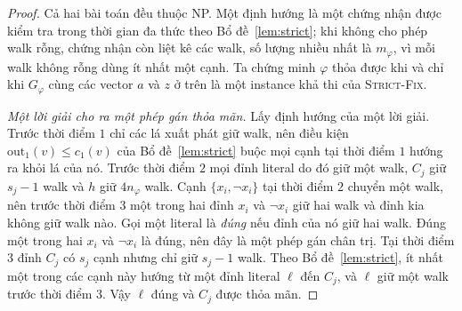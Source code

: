 \documentclass[pdflatex,sn-mathphys-num]{sn-jnl}
\theoremstyle{thmstyleone}%
\theoremstyle{thmstyletwo}%
\theoremstyle{thmstylethree}%
\newcommand{\out}{\mathrm{out}}
\newcommand{\SFIX}{\textup{\textsc{Strict-Fix}}}
\begin{document}
\begin{proof}
Cả hai bài toán đều thuộc NP. Một định hướng là một chứng nhận được kiểm tra trong thời gian đa thức theo Bổ đề~\ref{lem:strict}; khi không cho phép walk rỗng, chứng nhận còn liệt kê các walk, số lượng nhiều nhất là $m_\varphi$, vì mỗi walk không rỗng dùng ít nhất một cạnh. Ta chứng minh $\varphi$ thỏa được khi và chỉ khi $G_\varphi$ cùng các vector $a$ và $z$ ở trên là một instance khả thi của \SFIX{}.

\emph{Một lời giải cho ra một phép gán thỏa mãn.} Lấy định hướng của một lời giải. Trước thời điểm $1$ chỉ các lá xuất phát giữ walk, nên điều kiện $\out_1(v)\le c_1(v)$ của Bổ đề~\ref{lem:strict} buộc mọi cạnh tại thời điểm $1$ hướng ra khỏi lá của nó. Trước thời điểm $2$ mọi đỉnh literal do đó giữ một walk, $C_j$ giữ $s_j-1$ walk và $h$ giữ $4n_\varphi$ walk. Cạnh $\{x_i,\lnot x_i\}$ tại thời điểm $2$ chuyển một walk, nên trước thời điểm $3$ một trong hai đỉnh $x_i$ và $\lnot x_i$ giữ hai walk và đỉnh kia không giữ walk nào. Gọi một literal là \emph{đúng} nếu đỉnh của nó giữ hai walk. Đúng một trong hai $x_i$ và $\lnot x_i$ là đúng, nên đây là một phép gán chân trị. Tại thời điểm $3$ đỉnh $C_j$ có $s_j$ cạnh nhưng chỉ giữ $s_j-1$ walk. Theo Bổ đề~\ref{lem:strict}, ít nhất một trong các cạnh này hướng từ một đỉnh literal $\ell$ đến $C_j$, và $\ell$ giữ một walk trước thời điểm $3$. Vậy $\ell$ đúng và $C_j$ được thỏa mãn.


\end{proof}
\end{document}
